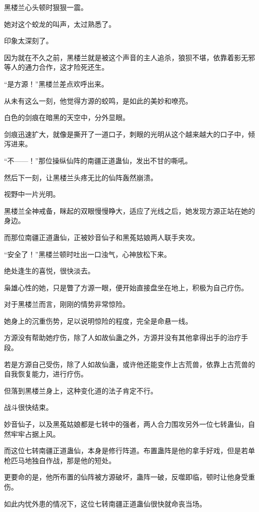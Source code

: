 \begin{this_body}
黑楼兰心头顿时狠狠一震。

她对这个蛟龙的叫声，太过熟悉了。

印象太深刻了。

因为就在不久之前，黑楼兰就是被这个声音的主人追杀，狼狈不堪，依靠着影无邪等人的通力合作，这才险死还生。

“是方源！”黑楼兰差点欢呼出来。

从未有这么一刻，他觉得方源的蛟鸣，是如此的美妙和嘹亮。

白色的剑痕在暗黑的天空中，分外显眼。

剑痕迅速扩大，就像是撕开了一道口子，刺眼的光明从这个越来越大的口子中，倾泻进来。

“不——！”那位操纵仙阵的南疆正道蛊仙，发出不甘的嘶吼。

然后下一刻，让黑楼兰头疼无比的仙阵轰然崩溃。

视野中一片光明。

黑楼兰全神戒备，眯起的双眼慢慢睁大，适应了光线之后，她发现方源正站在她的身边。

而那位南疆正道蛊仙，正被妙音仙子和黑菟姑娘两人联手夹攻。

“安全了！”黑楼兰顿时吐出一口浊气，心神放松下来。

绝处逢生的喜悦，很快淡去。

枭雄心性的她，只是瞥了方源一眼，便开始直接盘坐在地上，积极为自己疗伤。

对于黑楼兰而言，刚刚的情势非常惊险。

她身上的沉重伤势，足以说明惊险的程度，完全是命悬一线。

方源没有帮助她疗伤，除了人如故仙蛊之外，方源并没有其他拿得出手的治疗手段。

若是方源自己受伤，除了人如故仙蛊，或许他还能变作上古荒兽，依靠上古荒兽的自我恢复能力，进行疗伤。

但落到黑楼兰身上，这种变化道的法子肯定不行。

战斗很快结束。

妙音仙子，以及黑菟姑娘都是七转中的强者，两人合力围攻另外一位七转蛊仙，自然牢牢占据上风。

而这位七转南疆正道蛊仙，本身是修行阵道。布置蛊阵是他的拿手好戏，但是若单枪匹马地独自作战，那是他的短处。

更要命的是，他所布置的仙阵被方源破坏，蛊阵一破，反噬即临，顿时让他身受重伤。

如此内忧外患的情况下，这位七转南疆正道蛊仙很快就命丧当场。


\end{this_body}
